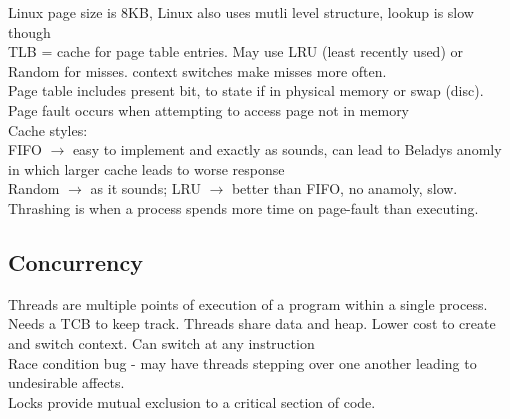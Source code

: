 \documentclass[8pt]{article}
\begin{document}
Linux page size is 8KB, Linux also uses mutli level structure, lookup is slow though
\\
TLB = cache for page table entries. May use LRU (least recently used) or Random for misses. context switches make misses more often.
\\
Page table includes present bit, to state if in physical memory or swap (disc). Page fault occurs when attempting to access page not in memory
\\
Cache styles:\\
FIFO $\rightarrow$ easy to implement and exactly as sounds, can lead to Beladys anomly in which larger cache leads to worse response
\\
Random $\rightarrow$ as it sounds; LRU $\rightarrow$ better than FIFO, no anamoly, slow.
\\
Thrashing is when a process spends more time on page-fault than executing.
\subsection*{Concurrency}
Threads are multiple points of execution of a program within a single process. Needs a TCB to keep track. Threads share data and heap.
Lower cost to create and switch context. Can switch at any instruction
\\
Race condition bug - may have threads stepping over one another leading to undesirable affects.
\\
Locks provide mutual exclusion to a critical section of code.
\\
\end{document}
